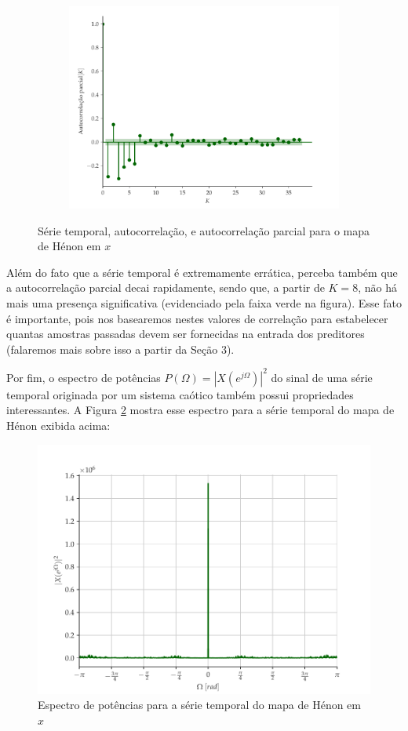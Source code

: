 \documentclass[a4paper, 12pt]{article}
\begin{document}
\begin{figure}[!ht]
\begin{subfigure}[b]{0.45\textwidth}
		\includegraphics[scale=0.4]{autocorrelacao-parcial-henon.pdf}
	\end{subfigure}
	\caption{Série temporal, autocorrelação, e autocorrelação parcial para o mapa de Hénon em $x$}
	\label{fig:henon-time-series}
\end{figure}

Além do fato que a série temporal é extremamente errática, perceba também que a autocorrelação parcial decai rapidamente, sendo que, a partir de $K = 8$, não há mais uma presença significativa (evidenciado pela faixa verde na figura). Esse fato é importante, pois nos basearemos nestes valores de correlação para estabelecer quantas amostras passadas devem ser fornecidas na entrada dos preditores (falaremos mais sobre isso a partir da Seção 3).

Por fim, o espectro de potências $P(\Omega) = |X(e^{j\Omega})|^2$ do sinal de uma série temporal originada por um sistema caótico também possui propriedades interessantes. A Figura \ref{fig:henon-power-spectrum} mostra esse espectro para a série temporal do mapa de Hénon exibida acima:
\begin{figure}[!ht]
\centering
\includegraphics[scale = 0.5]{power-spectrum-henon.pdf}
\caption{Espectro de potências para a série temporal do mapa de Hénon em $x$}
\label{fig:henon-power-spectrum}
\end{figure}
\end{document}
